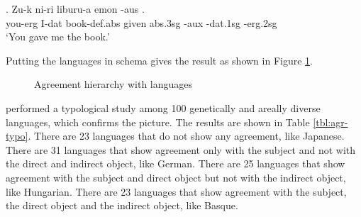 \exg. Zu-k ni-ri liburu-a emon  -aus  .\\
 you-\ac{erg} I-\ac{dat} book-\ac{def}.\ac{abs} given \ac{abs}.3\ac{sg} -\ac{aux} -\ac{dat}.1\ac{sg} -\ac{erg}.2\ac{sg}\\
 `You gave me the book.' \label{ex:basque-agr}

Putting the languages in  schema gives the result as shown in Figure \ref{fig:agr-sub-do-io-lang}.

 \begin{figure}[H]
   \centering
   \caption{Agreement hierarchy with languages}
   \label{fig:agr-sub-do-io-lang}
 \end{figure}

\citet{gilligan1987} performed a typological study among 100 genetically and areally diverse languages, which confirms the picture. The results are shown in Table \ref{tbl:agr-typo}. There are 23 languages that do not show any agreement, like Japanese. There are 31 languages that show agreement only with the subject and not with the direct and indirect object, like German. There are 25 languages that show agreement with the subject and direct object but not with the indirect object, like Hungarian. There are 23 languages that show agreement with the subject, the direct object and the indirect object, like Basque.

